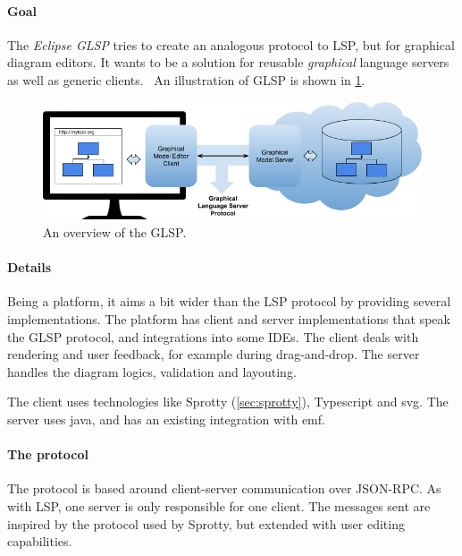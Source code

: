 \paragraph*{Goal}
The \emph{Eclipse \gls{GLSP}} tries to create an analogous protocol to \gls{LSP}, but for graphical diagram editors.
It wants to be a solution for reusable \emph{graphical} language servers as well as generic clients.~\cite{jonashelmingGraphicalLanguageServer2019}
An illustration of \gls{GLSP} is shown in \cref{fig:glsp-overview}.

\begin{figure}[htbp]  
  \centering
  \includegraphics[width=\textwidth]{figures/glsp-overview.png}
  \caption[GLSP Overview]{An overview of the \gls{GLSP}.~\cite{eclipsefoundationGLSP2020}}\label{fig:glsp-overview}
\end{figure}

\paragraph*{Details}
Being a platform, it aims a bit wider than the \gls{LSP} protocol by providing several implementations.
The platform has client and server implementations that speak the \gls{GLSP} protocol, and integrations into some \glspl{IDE}.
The client deals with rendering and user feedback, for example during drag-and-drop.
The server handles the diagram logics, validation and layouting.~\cite{jonashelmingGraphicalLanguageServer2019}

The client uses technologies like Sprotty (\cref{sec:sprotty}), Typescript and \acrshort{svg}.
The server uses java, and has an existing integration with \gls{emf}.~\cite{eclipsefoundationGLSP2020}

\paragraph*{The protocol}
The protocol is based around client-server communication over \gls{JSON-RPC}.
As with \gls{LSP}, one server is only responsible for one client.
The messages sent are inspired by the protocol used by Sprotty, but extended with user editing capabilities.~\cite{philiplangerEclipseglspGlspPROTOCOL2020}

